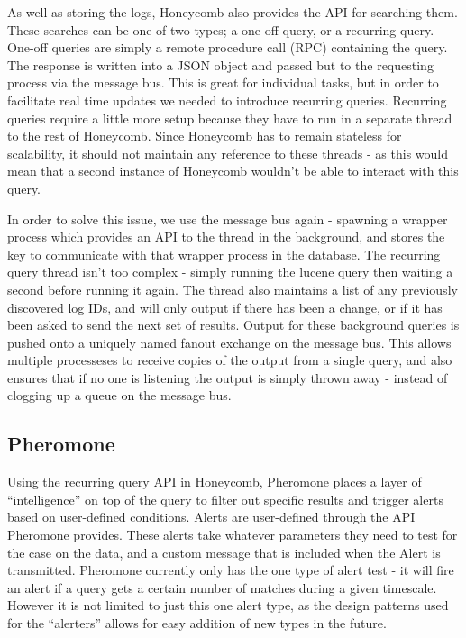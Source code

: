 As well as storing the logs, Honeycomb also provides the API for searching
them. These searches can be one of two types; a one-off query, or a recurring
query. One-off queries are simply a remote procedure call (RPC) containing the
query. The response is written into a JSON object and passed but to the
requesting process via the message bus. This is great for individual tasks, but
in order to facilitate real time updates we needed to introduce recurring
queries. Recurring queries require a little more setup because they have to run
in a separate thread to the rest of Honeycomb. Since Honeycomb has to remain
stateless for scalability, it should not maintain any reference to these
threads - as this would mean that a second instance of Honeycomb wouldn’t be
able to interact with this query.

In order to solve this issue, we use the message bus again - spawning a wrapper
process which provides an API to the thread in the background, and stores the
key to communicate with that wrapper process in the database. The recurring
query thread isn’t too complex - simply running the lucene query then waiting a
second before running it again. The thread also maintains a list of any
previously discovered log IDs, and will only output if there has been a change,
or if it has been asked to send the next set of results. Output for these
background queries is pushed onto a uniquely named fanout exchange on the
message bus. This allows multiple processeses to receive copies of the output
from a single query, and also ensures that if no one is listening the output is
simply thrown away - instead of clogging up a queue on the message bus.

\subsection{Pheromone}

Using the recurring query API in Honeycomb, Pheromone places a layer of
“intelligence” on top of the query to filter out specific results and trigger
alerts based on user-defined conditions. Alerts are user-defined through the
API Pheromone provides. These alerts take whatever parameters they need to test
for the case on the data, and a custom message that is included when the Alert
is transmitted. Pheromone currently only has the one type of alert test - it
will fire an alert if a query gets a certain number of matches during a given
timescale. However it is not limited to just this one alert type, as the
design patterns used for the “alerters” allows for easy addition of new types
in the future.


